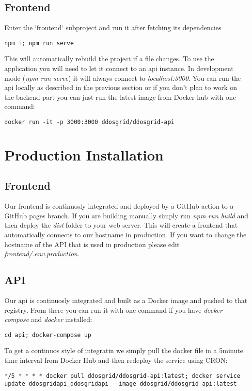 \subsection{Frontend}
Enter the `frontend` subproject and run it after fetching its dependencies
\begin{lstlisting}
npm i; npm run serve
\end{lstlisting}{}
This will automatically rebuild the project if a file changes. 
To use the application you will need to let it connect to an api instance.
In development mode (\textit{npm run serve}) it will always connect to \textit{localhost:3000}.
You can run the api locally as described in the previous section or if you don't plan to work on the backend part you can just run the latest image from Docker hub with one command:
\begin{lstlisting}
docker run -it -p 3000:3000 ddosgrid/ddosgrid-api
\end{lstlisting}{}

\section{Production Installation}
\subsection{Frontend}
Our frontend is continuosly integrated and deployed by a GitHub action to a GitHub pages branch.
If you are building manually simply run \textit{npm run build} and then deploy the \textit{dist} folder to your web server.
This will create a frontend that automatically connects to our hostname in production. If you want to change the hostname of the API that is used in production please edit \textit{frontend/.env.production}.

\subsection{API}
Our api is continuosly integrated and built as a Docker image and pushed to that registry.
From there you can run it with one command if you have \textit{docker-compose} and \textit{docker} installed:
\begin{lstlisting}
cd api; docker-compose up
\end{lstlisting}{}

To get a continuos style of integratin we simply pull the docker file in a 5minute time interval from Docker Hub and then redeploy the service using CRON:
\begin{lstlisting}
*/5 * * * * docker pull ddosgrid/ddosgrid-api:latest; docker service update ddosgridapi_ddosgridapi --image ddosgrid/ddosgrid-api:latest
\end{lstlisting}

